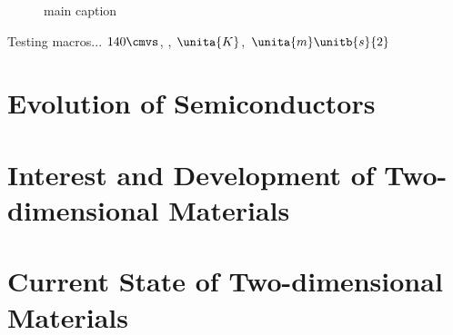 \begin{figure}[ht]
	\centering
	\qquad

	\qquad
	\caption{main caption}
	\label{fig:figure}
\end{figure}

Testing macros... $140\cmvs$, \hbn, $\unita{K}$, $\unita{m}\unitb{s}{2}$

\section{Evolution of Semiconductors}\label{sec:semicond_evolution}

\section{Interest and Development of Two-dimensional Materials}\label{sec:2D_development}

\section{Current State of Two-dimensional Materials}\label{sec:current_state}